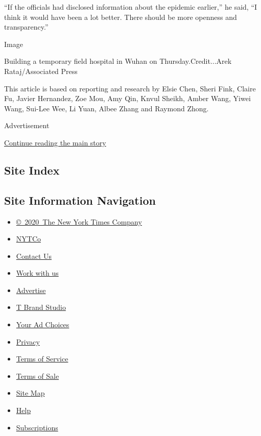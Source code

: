 ``If the officials had disclosed information about the epidemic
earlier,'' he said, ``I think it would have been a lot better. There
should be more openness and transparency.''

Image

Building a temporary field hospital in Wuhan on Thursday.Credit...Arek
Rataj/Associated Press

This article is based on reporting and research by Elsie Chen, Sheri
Fink, Claire Fu, Javier Hernandez, Zoe Mou, Amy Qin, Knvul Sheikh, Amber
Wang, Yiwei Wang, Sui-Lee Wee, Li Yuan, Albee Zhang and Raymond Zhong.

Advertisement

\protect\hyperlink{after-bottom}{Continue reading the main story}

\hypertarget{site-index}{%
\subsection{Site Index}\label{site-index}}

\hypertarget{site-information-navigation}{%
\subsection{Site Information
Navigation}\label{site-information-navigation}}

\begin{itemize}
\tightlist
\item
  \href{https://help.nytimes3xbfgragh.onion/hc/en-us/articles/115014792127-Copyright-notice}{©~2020~The
  New York Times Company}
\end{itemize}

\begin{itemize}
\tightlist
\item
  \href{https://www.nytco.com/}{NYTCo}
\item
  \href{https://help.nytimes3xbfgragh.onion/hc/en-us/articles/115015385887-Contact-Us}{Contact
  Us}
\item
  \href{https://www.nytco.com/careers/}{Work with us}
\item
  \href{https://nytmediakit.com/}{Advertise}
\item
  \href{http://www.tbrandstudio.com/}{T Brand Studio}
\item
  \href{https://www.nytimes3xbfgragh.onion/privacy/cookie-policy\#how-do-i-manage-trackers}{Your
  Ad Choices}
\item
  \href{https://www.nytimes3xbfgragh.onion/privacy}{Privacy}
\item
  \href{https://help.nytimes3xbfgragh.onion/hc/en-us/articles/115014893428-Terms-of-service}{Terms
  of Service}
\item
  \href{https://help.nytimes3xbfgragh.onion/hc/en-us/articles/115014893968-Terms-of-sale}{Terms
  of Sale}
\item
  \href{https://spiderbites.nytimes3xbfgragh.onion}{Site Map}
\item
  \href{https://help.nytimes3xbfgragh.onion/hc/en-us}{Help}
\item
  \href{https://www.nytimes3xbfgragh.onion/subscription?campaignId=37WXW}{Subscriptions}
\end{itemize}
